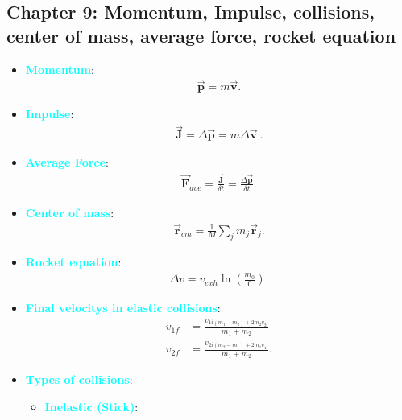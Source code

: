 \documentclass{report}
\begin{document}
    \pagebreak 
    \subsection{Chapter 9: Momentum, Impulse, collisions, center of mass, average force, rocket equation}
    \begin{itemize}
        \item \textbf{\textcolor{cyan}{Momentum}}:
            \begin{align*}
                \vec{\mathbf{p}} = m\vec{\mathbf{v}}
            .\end{align*}
        \item \textbf{\textcolor{cyan}{Impulse}}:
            \begin{align*}
                \vec{\mathbf{J}} = \Delta \vec{\mathbf{p}} = m\Delta \vec{\mathbf{v}}\
            .\end{align*}
        \item \textbf{\textcolor{cyan}{Average Force}}:
            \begin{align*}
                \vec{\mathbf{F}}_{ave } = \frac{\vec{\mathbf{J}}}{\delta t} = \frac{\Delta \vec{\mathbf{p}}}{\delta t}
            .\end{align*}
        \item \textbf{\textcolor{cyan}{Center of mass}}:
            \begin{align*}
                \vec{\mathbf{r}}_{cm} = \frac{1}{M}\sum_jm_{j}\vec{\mathbf{r}}_{j}
            .\end{align*}
        \item \textbf{\textcolor{cyan}{Rocket equation}}:
            \begin{align*}
                \Delta v = v_{exh}\ln{\left(\frac{m_{0}}{0}\right)}
            .\end{align*}
        \item \textbf{\textcolor{cyan}{Final velocitys in elastic collisions}}:
            \begin{align*}
                v_{1f} &= \frac{v_{1i(m_{1} - m_{2}) + 2m_{2}v_{2i}}}{m_{1} + m_{2}}\\
                v_{2f} &= \frac{v_{2i(m_{2} - m_{1}) + 2m_{1}v_{1i}}}{m_{1} + m_{2}}
            .\end{align*}
        \item \textbf{\textcolor{cyan}{Types of collisions}}:
            \begin{itemize}
                \item \textbf{\textcolor{cyan}{Inelastic (Stick)}}:

\end{itemize}
\end{itemize}
\end{document}
